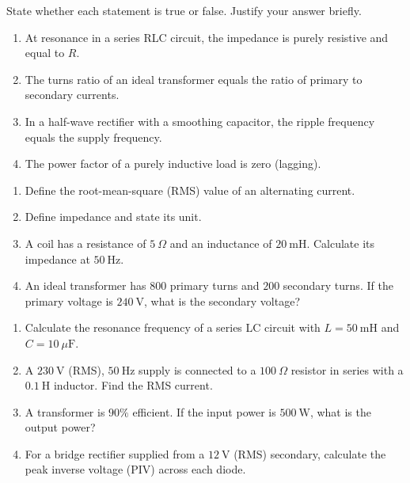 \documentclass[11pt]{article}
\newcommand{\cle}[1]{{\popxbold\color{popdark}#1}}
\begin{document}
\begin{exercice}
State whether each statement is true or false. Justify your answer briefly.
\begin{enumerate}
\item At resonance in a series RLC circuit, the impedance is purely resistive and equal to $R$.
\item The turns ratio of an ideal transformer equals the ratio of primary to secondary currents.
\item In a half-wave rectifier with a smoothing capacitor, the ripple frequency equals the supply frequency.
\item The power factor of a purely inductive load is zero (lagging).
\end{enumerate}
\end{exercice}

\begin{exercice}
\begin{enumerate}
\item Define the \cle{root-mean-square (RMS) value} of an alternating current.
\item Define \cle{impedance} and state its unit.
\item A coil has a resistance of $5\ \Omega$ and an inductance of $20\ \mathrm{mH}$. Calculate its impedance at $50\ \mathrm{Hz}$.
\item An ideal transformer has $800$ primary turns and $200$ secondary turns. If the primary voltage is $240\ \mathrm{V}$, what is the secondary voltage?
\end{enumerate}
\end{exercice}

\begin{exercice}
\begin{enumerate}
\item Calculate the resonance frequency of a series LC circuit with $L=50\ \mathrm{mH}$ and $C=10\ \mu\mathrm{F}$.
\item A $230\ \mathrm{V}$ (RMS), $50\ \mathrm{Hz}$ supply is connected to a $100\ \Omega$ resistor in series with a $0.1\ \mathrm{H}$ inductor. Find the RMS current.
\item A transformer is $90\%$ efficient. If the input power is $500\ \mathrm{W}$, what is the output power?
\item For a bridge rectifier supplied from a $12\ \mathrm{V}$ (RMS) secondary, calculate the peak inverse voltage (PIV) across each diode.
\end{enumerate}
\end{exercice}
\end{document}
